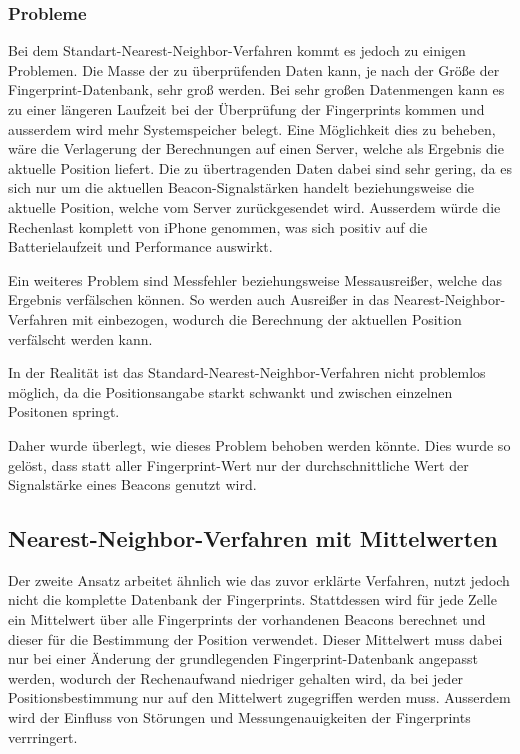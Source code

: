 \subsubsection{Probleme}
\label{sec:implementation:fingerprinting:positioning:naiv:problems}
Bei dem Standart-Nearest-Neighbor-Verfahren kommt es jedoch zu einigen Problemen. 
Die Masse der zu überprüfenden Daten kann, je nach der Größe der Fingerprint-Datenbank, sehr groß werden. Bei sehr großen Datenmengen kann es zu einer längeren Laufzeit bei der Überprüfung der Fingerprints kommen und ausserdem wird mehr Systemspeicher belegt. 
Eine Möglichkeit dies zu beheben, wäre die Verlagerung der Berechnungen auf einen Server, welche als Ergebnis die aktuelle Position liefert. Die zu übertragenden Daten dabei sind sehr gering, da es sich nur um die aktuellen Beacon-Signalstärken handelt beziehungsweise die aktuelle Position, welche vom Server zurückgesendet wird. 
Ausserdem würde die Rechenlast komplett von iPhone genommen, was sich positiv auf die Batterielaufzeit und Performance auswirkt.

Ein weiteres Problem sind Messfehler beziehungsweise Messausreißer, welche das Ergebnis verfälschen können. So werden auch Ausreißer in das Nearest-Neighbor-Verfahren mit einbezogen, wodurch die Berechnung der aktuellen Position verfälscht werden kann.

In der Realität ist das Standard-Nearest-Neighbor-Verfahren nicht problemlos möglich, da die Positionsangabe starkt schwankt und zwischen einzelnen Positonen springt.

Daher wurde überlegt, wie dieses Problem behoben werden könnte. Dies wurde so gelöst, dass statt aller Fingerprint-Wert nur der durchschnittliche Wert der Signalstärke eines Beacons genutzt wird.


\subsection{Nearest-Neighbor-Verfahren mit Mittelwerten}
\label{sec:implementation:fingerprinting:positioning:avg}
Der zweite Ansatz arbeitet ähnlich wie das zuvor erklärte Verfahren, nutzt jedoch nicht die komplette Datenbank der Fingerprints. 
Stattdessen wird für jede Zelle ein Mittelwert über alle Fingerprints der vorhandenen Beacons berechnet und dieser für die Bestimmung der Position verwendet.
Dieser Mittelwert muss dabei nur bei einer Änderung der grundlegenden Fingerprint-Datenbank angepasst werden, wodurch der Rechenaufwand niedriger gehalten wird, da bei jeder Positionsbestimmung nur auf den Mittelwert zugegriffen werden muss.
Ausserdem wird der Einfluss von Störungen und Messungenauigkeiten der Fingerprints verrringert.


